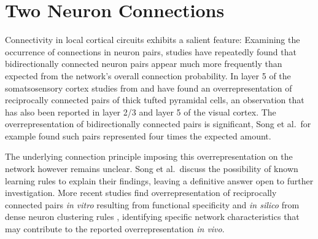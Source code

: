 \newpage

\section{Two Neuron Connections}


Connectivity in local cortical circuits exhibits a salient feature:
Examining the occurrence of connections in neuron pairs, studies have
repeatedly found that bidirectionally connected neuron pairs appear
much more frequently than expected from the network's overall
connection probability. In layer 5 of the somatsosensory cortex
studies from \textcite{Markram1997_TL5} and \textcite{Perin2011} have
found an overrepresentation of reciprocally connected pairs of thick
tufted pyramidal cells, an observation that has also been reported in
layer 2/3 \parencite{Holmgren2003} and layer 5 \parencite{Song2005} of
the visual cortex. The overrepresentation of bidirectionally connected
pairs is significant, Song et al.~for example found such pairs
represented four times the expected amount.

The underlying connection principle imposing this overrepresentation
on the network however remains unclear. Song et al.~discuss the
possibility of known learning rules to explain their findings, leaving
a definitive answer open to further investigation. More recent studies
find overrepresentation of reciprocally connected pairs \textit{in
  vitro} resulting from functional specificity \parencite{Ko2011} and
\textit{in silico} from dense neuron clustering
rules \parencite{Klinshov2014}, identifying specific network
characteristics that may contribute to the reported overrepresentation
\textit{in vivo}. 


